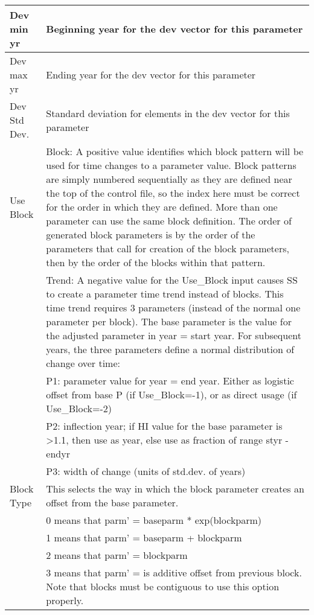 \begin{center}
\begin{longtable}{p{2.5cm} p{13cm}}
		\hline
		Dev min yr & Beginning year for the dev vector for this parameter\\
		\hline
		Dev max yr & Ending year for the dev vector for this parameter\\
		\hline
		Dev Std Dev. & Standard deviation for elements in the dev vector for this parameter \\
		\hline
		Use Block & Block: A positive value identifies which block pattern will be used for time changes to a parameter value.  Block patterns are simply numbered sequentially as they are defined near the top of the control file, so the index here must be correct for the order in which they are defined.  More than one parameter can use the same block definition.  The order of generated block parameters is by the order of the parameters that call for creation of the block parameters, then by the order of the blocks within that pattern. \\
				  & Trend:  A negative value for the Use\_Block input causes SS to create a parameter time trend instead of blocks.  This time trend requires 3 parameters (instead of the normal one parameter per block).  The base parameter is the value for the adjusted parameter in year = start year.  For subsequent years, the three parameters define a normal distribution of change over time:\\
				  & P1:  parameter value for year = end year.  Either as logistic offset from base P (if Use\_Block=-1), or as direct usage (if Use\_Block=-2)\\
				  & P2:  inflection year;  if HI value for the base parameter is >1.1, then use as year, else use as fraction of range styr - endyr\\
				  & P3:  width of change (units of std.dev. of years)\\
		\hline
		Block Type & This selects the way in which the block parameter creates an offset from the base parameter. \\
				   & 0 means that parm’ = baseparm * exp(blockparm)\\
				   & 1 means that parm’ = baseparm + blockparm\\
				   & 2 means that parm’ = blockparm\\
				   & 3 means that parm’ = is additive offset from previous block.  Note that blocks must be contiguous to use this option properly.\\
		\hline
	\end{longtable}
\end{center}

